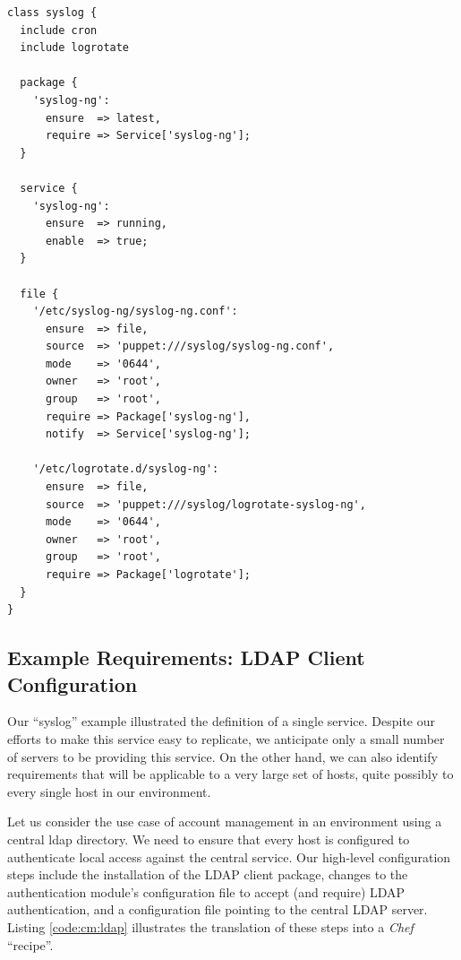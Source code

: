 \begin{minipage}{.9\linewidth}
\begin{lstlisting}[basicstyle=\scriptsize,label=code:cm:syslog,caption={Excerpt of a Puppet
``manifest'' defining the 'syslog' service.}]
class syslog {
  include cron
  include logrotate

  package {
    'syslog-ng':
      ensure  => latest,
      require => Service['syslog-ng'];
  }

  service {
    'syslog-ng':
      ensure  => running,
      enable  => true;
  }

  file {
    '/etc/syslog-ng/syslog-ng.conf':
      ensure  => file,
      source  => 'puppet:///syslog/syslog-ng.conf',
      mode    => '0644',
      owner   => 'root',
      group   => 'root',
      require => Package['syslog-ng'],
      notify  => Service['syslog-ng'];

    '/etc/logrotate.d/syslog-ng':
      ensure  => file,
      source  => 'puppet:///syslog/logrotate-syslog-ng',
      mode    => '0644',
      owner   => 'root',
      group   => 'root',
      require => Package['logrotate'];
  }
}
\end{lstlisting}
\end{minipage}

\subsection{Example Requirements: LDAP Client Configuration}
\label{configuration-management:defining-services:ldap-client}

Our ``syslog'' example illustrated the definition of a
single service.  Despite our efforts to make this
service easy to replicate, we anticipate only a small
number of servers to be providing this service.  On
the other hand, we can also identify requirements that
will be applicable to a very large set of hosts, quite
possibly to every single host in our environment.

Let us consider the use case of account management in
an environment using a central \gls{ldap} directory.  We
need to ensure that every host is configured to
authenticate local access against the central service.
Our high-level configuration steps include the
installation of the LDAP client package, changes to
the authentication module's configuration file to
accept (and require) LDAP authentication, and a
configuration file pointing to the central LDAP
server.  Listing \ref{code:cm:ldap} illustrates the
translation of these steps into a {\em Chef}
``recipe''.

